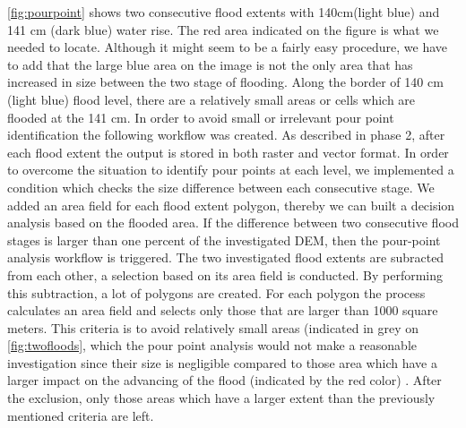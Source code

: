 \autoref{fig:pourpoint} shows two consecutive flood extents with 140cm(light blue) and 141 cm (dark blue) water rise. The red area indicated on the figure is what we needed to locate. Although it might seem to be a fairly easy procedure, we have to add that the large blue area on the image is not the only area that has increased in size between the two stage of flooding. Along the border of 140 cm (light blue) flood level, there are a relatively small areas or cells  which are flooded at the 141 cm. In order to avoid small or irrelevant pour point identification the following workflow was created. 
As described in phase 2, after each flood extent the output is stored in both raster and vector format. In order to overcome the situation to identify pour points at each level, we implemented a condition which checks the size difference between each consecutive stage. We added an area field for each flood extent polygon, thereby we can built a decision analysis based on the flooded area. If the difference between two consecutive flood stages is larger than one percent of the investigated DEM, then the pour-point analysis workflow is triggered. The two investigated flood extents are subracted from each other, a selection based on its area field is conducted. By performing this subtraction, a lot of polygons are created. For each polygon the process calculates an area field and selects only those that are larger than 1000 square meters. This criteria is to avoid relatively small areas (indicated in grey on \autoref{fig:twofloods}, which the pour point analysis would not make a reasonable investigation since their size is negligible compared to those area which have a larger impact on the advancing of the flood (indicated by the red color) . After the exclusion, only those areas which have a larger extent than the previously mentioned criteria are left.\\


